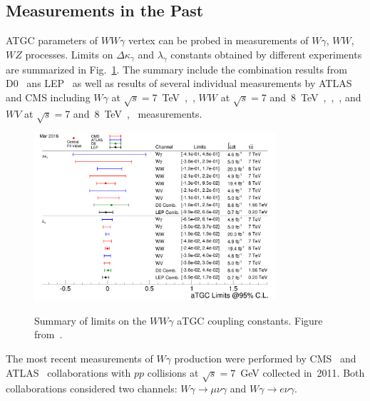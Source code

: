 \subsection{Measurements in the Past}
\label{sec:WgAbout_PastMeas}

ATGC parameters of $WW\gamma$ vertex can be probed in measurements of $W\gamma$, $WW$, $WZ$ processes. Limits on $\Delta \kappa_\gamma$ and $\lambda_\gamma$ constants obtained by different experiments are summarized in Fig.~\ref{fig:aTGC_cg}. The summary include the combination results from D0~\cite{ref_D0_aTGC_comb} ans LEP~\cite{ref_LEP_aTGC_comb} as well as results of several individual measurements by ATLAS and CMS including $W\gamma$ at $\sqrt{s}=$7~TeV~\cite{ref_7TeV_ATLAS},~\cite{ref_7TeV_CMS}, $WW$ at $\sqrt{s}=$7 and~8~TeV~\cite{ref_ATLAS_WW_8TeV},~\cite{ref_CMS_WW_7TeV},~\cite{ref_CMS_WW_8TeV}, and $WV$ at $\sqrt{s}=$7 and~8~TeV~\cite{ref_ATLAS_VW_8TeV},~\cite{ref_CMS_VW_7TeV} measurements.\\ 

\begin{figure}[htb]
  \begin{center}
    {\includegraphics[width=0.80\textwidth]{../figs/WgAbout/aTGC_cg.png}}
    \caption{Summary of limits on the $WW\gamma$ aTGC coupling constants. Figure from~\cite{ref_twiki_SMP_ATGC}.}
    \label{fig:aTGC_cg}
  \end{center}
\end{figure}

The most recent measurements of $W\gamma$ production were performed by CMS~\cite{ref_7TeV_CMS} and ATLAS~\cite{ref_7TeV_ATLAS} collaborations with $pp$ collisions at $\sqrt{s}=7$~GeV collected in~2011. Both collaborations considered two channels: $W\gamma\rightarrow\mu\nu\gamma$ and $W\gamma\rightarrow e\nu\gamma$.\\

